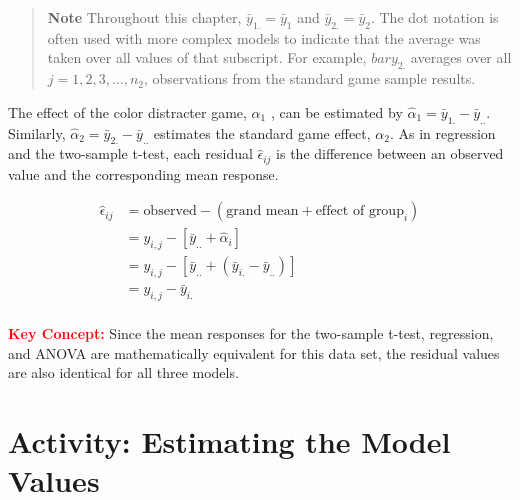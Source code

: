 \documentclass[
]{report}
\begin{document}
\begin{quote}
\textbf{Note}
Throughout this chapter, \(\bar{y}_{1.} = \bar{y}_{1}\) and \(\bar{y}_{2.} = \bar{y}_{2}\). The dot notation is often used with more complex models
to indicate that the average was taken over all values of that subscript. For example, \(bar{y}_{2.}\) averages over all
\(j = 1, 2, 3, ... , n_2\), observations from the standard game sample results.
\end{quote}

The effect of the color distracter game, \(\alpha_1\) , can be estimated by \(\hat{\alpha}_1 = \bar{y}_{1.} - \bar{y}_{..}\). Similarly, \(\hat{\alpha}_2 = \bar{y}_{2.} - \bar{y}_{..}\)
estimates the standard game effect, \(\alpha_2\). As in regression and the two-sample t-test, each residual \(\hat{\epsilon}_{ij}\) is the
difference between an observed value and the corresponding mean response.

\[
\begin{aligned}
\hat{\epsilon}_{ij}  
  &= \text{observed} - (\text{grand mean} + \text{effect of group}_i)\\
  &= y_{i,j} - [\bar{y}_{..} + \hat{\alpha}_i]\\
  &= y_{i,j} - [\bar{y}_{..} + (\bar{y}_{i.} - \bar{y}_{..})]\\
  &= y_{i,j} - \bar{y}_{i.}\\
\end{aligned}  
\]

\Large

\textbf{\textcolor{red}{Key Concept:}}
\color{red}
Since the mean responses for the two-sample t-test, regression, and ANOVA are mathematically equivalent for this data set, the residual values are also identical for all three models.
\color{black}
\normalsize

\section*{Activity: Estimating the Model Values}\label{activity-estimating-the-model-values}
\end{document}
